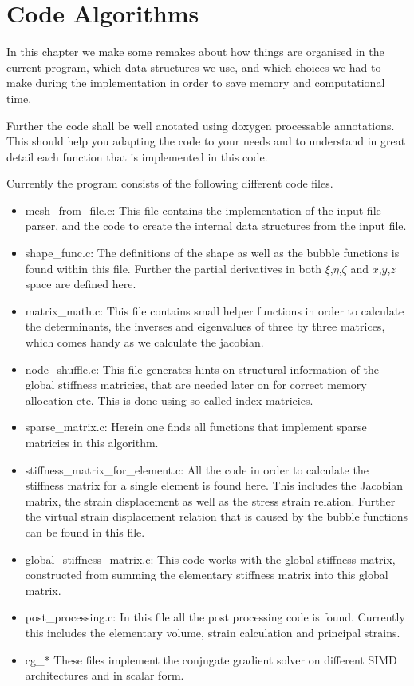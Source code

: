 \chapter{Code Algorithms}

In this chapter we make some remakes about how things are organised
in the current program, which data structures we use, and which
choices we had to make during the implementation in order to save
memory and computational time.

Further the code shall be well anotated using doxygen processable
annotations. This should help you adapting the code to your needs and
to understand in great detail each function that is implemented in
this code. 

Currently the program consists of the following different code files.

\begin{itemize}
  \item mesh\_from\_file.c: This file contains the implementation of
    the input file parser, and the code to create the internal data
    structures from the input file.
  \item shape\_func.c: The definitions of the shape as well as the
    bubble functions is found within this file. Further the partial
    derivatives in both $\xi$,$\eta$,$\zeta$ and $x$,$y$,$z$ space
    are defined here.
  \item matrix\_math.c: This file contains small helper functions in
    order to calculate the determinants, the inverses and eigenvalues
    of three by three matrices, which comes handy as we calculate the jacobian.
  \item node\_shuffle.c: This file generates hints on structural information of
    the global stiffness matricies, that are needed later on for correct memory
    allocation etc. This is done using so called index matricies.
  \item sparse\_matrix.c: Herein one finds all functions that implement
    sparse matricies in this algorithm.
  \item stiffness\_matrix\_for\_element.c: All the code in order to
    calculate the stiffness matrix for a single element is found
    here. This includes the Jacobian matrix, the strain displacement
    as well as the stress strain relation. Further the virtual strain
    displacement relation that is caused by the bubble functions can be
    found in this file.
  \item global\_stiffness\_matrix.c: This code works with the global
    stiffness matrix, constructed from summing the elementary stiffness
    matrix into this global matrix.
  \item post\_processing.c: In this file all the post processing code
    is found. Currently this includes the elementary volume,
    strain calculation and principal strains.
  \item cg\_* These files implement the conjugate gradient solver on different
    SIMD architectures and in scalar form.
\end{itemize}
    
